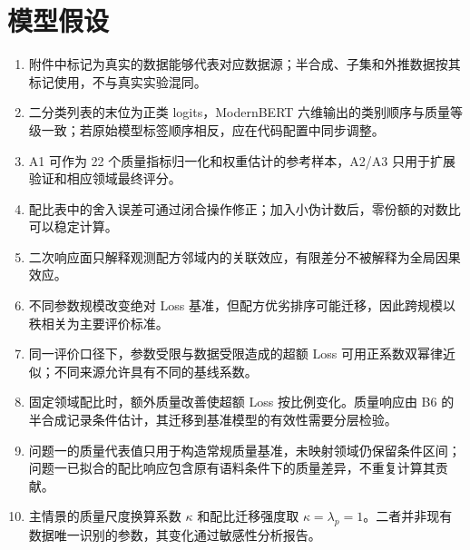 \documentclass[bwprint]{gmcmthesis}
\begin{document}
\section{模型假设}  %
\begin{enumerate}[label=\textbf{H\arabic*.},leftmargin=2.5em]
    \item 附件中标记为真实的数据能够代表对应数据源；半合成、子集和外推数据按其标记使用，不与真实实验混同。
    \item 二分类列表的末位为正类 logits，ModernBERT 六维输出的类别顺序与质量等级一致；若原始模型标签顺序相反，应在代码配置中同步调整。
    \item A1 可作为 22 个质量指标归一化和权重估计的参考样本，A2/A3 只用于扩展验证和相应领域最终评分。
    \item 配比表中的舍入误差可通过闭合操作修正；加入小伪计数后，零份额的对数比可以稳定计算。
    \item 二次响应面只解释观测配方邻域内的关联效应，有限差分不被解释为全局因果效应。
    \item 不同参数规模改变绝对 Loss 基准，但配方优劣排序可能迁移，因此跨规模以秩相关为主要评价标准。
    
    \item 同一评价口径下，参数受限与数据受限造成的超额 Loss 可用正系数双幂律近似；不同来源允许具有不同的基线系数。
    \item 固定领域配比时，额外质量改善使超额 Loss 按比例变化。质量响应由 B6 的半合成记录条件估计，其迁移到基准模型的有效性需要分层检验。
    \item 问题一的质量代表值只用于构造常规质量基准，未映射领域仍保留条件区间；问题一已拟合的配比响应包含原有语料条件下的质量差异，不重复计算其贡献。
    \item 主情景的质量尺度换算系数 $\kappa$ 和配比迁移强度取 $\kappa=\lambda_p=1$。二者并非现有数据唯一识别的参数，其变化通过敏感性分析报告。
    
\end{enumerate}
\end{document}
